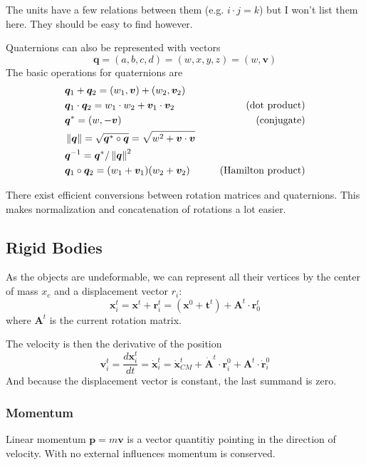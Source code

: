 \documentclass{article}
\newcommand{\norm}[1]{\left\lVert#1\right\rVert}
\begin{document}
The units have a few relations between them (e.g. $i \cdot j = k$) but I won't list them here.
They should be easy to find however.

Quaternions can also be represented with vectors
\begin{equation}
    \bm{q} = (a,b,c,d) = (w,x,y,z) = (w, \bm{v})
\end{equation}
The basic operations for quaternions are
\begin{align}
    &\bm{q}_1 + \bm{q}_2 = (w_1, \bm{v}) + (w_2, \bm{v}_2)\\
    &\bm{q}_1 \cdot \bm{q}_2 = w_1 \cdot w_2 + \bm{v}_1 \cdot \bm{v}_2 \qquad &\textup{(dot product)}\\
    &\bm{q}^* = (w, -\bm{v}) \qquad &\textup{(conjugate)}\\
    &\norm{\bm{q}} = \sqrt{\bm{q}^* \circ \bm{q}} = \sqrt{w^2 + \bm{v} \cdot \bm{v}}\\
    &\bm{q}^{-1} = \bm{q}^* / \norm{\bm{q}}^2\\
    &\bm{q}_1 \circ \bm{q}_2 = (w_1 + \bm{v}_1) (w_2 + \bm{v}_2) \qquad &\textup{(Hamilton product)}
\end{align}

There exist efficient conversions between rotation matrices and quaternions.
This makes normalization and concatenation of rotations a lot easier.

\subsection{Rigid Bodies}
As the objects are undeformable, we can represent all their vertices by the center of mass $x_c$ and a displacement vector $r_i$:
\begin{equation}
    \bm{x}_i^t = \bm{x}^t + \bm{r}_i^t = (\bm{x}^0 + \bm{t}^t) + \bm{A}^t \cdot \bm{r}_0^t
\end{equation}
where $\bm{A}^t$ is the current rotation matrix.

The velocity is then the derivative of the position
\begin{equation}
    \bm{v}_i^t = \frac{d\bm{x}_i^t}{dt} = \dot{\bm{x}}_i^t = \dot{\bm{x}}_{CM}^t + \dot{\bm{A}}^t \cdot \bm{r}_i^0 + \bm{A}^t \cdot \dot{\bm{r}}_i^0
\end{equation}
And because the displacement vector is constant, the last summand is zero.

\subsubsection{Momentum}
Linear momentum $\bm{p} = m \bm{v}$ is a vector quantitiy pointing in the direction of velocity.
With no external influences momentum is conserved.
\end{document}
